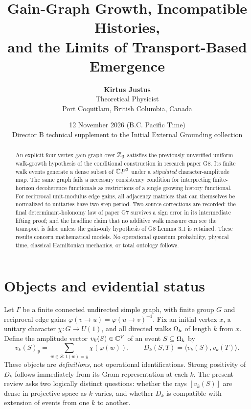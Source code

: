 \documentclass[11pt]{article}
\title{\vspace{-1.7em}\color{navy}\bfseries Gain-Graph Growth, Incompatible Histories,\\ and the Limits of Transport-Based Emergence}
\author{\textbf{Kirtus Justus}\\Theoretical Physicist\\Port Coquitlam, British Columbia, Canada}
\date{12 November 2026 (B.C. Pacific Time)\\\small Director B technical supplement to the Initial External Grounding collection}
\begin{document}
\maketitle\thispagestyle{fancy}
\begin{abstract}
An explicit four-vertex gain graph over $\mathbb Z_3$ satisfies the previously unverified uniform walk-growth hypothesis of the conditional construction in research paper G8. Its finite walk events generate a dense subset of $\mathbb C P^3$ under a \emph{stipulated} character-amplitude map. The same graph fails a necessary consistency condition for interpreting finite-horizon decoherence functionals as restrictions of a single growing history functional. For reciprocal unit-modulus edge gains, all adjacency matrices that can themselves be normalized to unitaries have two-step period. Two source corrections are recorded: the final determinant-holonomy law of paper G7 survives a sign error in its intermediate lifting proof; and the headline claim that no additive walk measure can see the transport is false unless the gain-only hypothesis of G8 Lemma 3.1 is retained. These results concern mathematical models. No operational quantum probability, physical time, classical Hamiltonian mechanics, or total ontology follows.
\end{abstract}

\section{Objects and evidential status}
Let $\Gamma$ be a finite connected undirected simple graph, with finite group $G$ and reciprocal edge gains $\varphi(v\to u)=\varphi(u\to v)^{-1}$. Fix an initial vertex $x$, a unitary character $\chi:G\to U(1)$, and all directed walks $\Omega_k$ of length $k$ from $x$. Define the amplitude vector $v_k(S)\in\mathbb C^V$ of an event $S\subseteq\Omega_k$ by
\begin{equation}\label{eq:v}
 v_k(S)_y=\sum_{w\in S:\,t(w)=y}\chi(\varphi(w)),\qquad D_k(S,T)=\langle v_k(S),v_k(T)\rangle.
\end{equation}
These objects are \emph{definitions}, not operational identifications. Strong positivity of $D_k$ follows immediately from its Gram representation at each $k$. The present review asks two logically distinct questions: whether the rays $[v_k(S)]$ are dense in projective space as $k$ varies, and whether $D_k$ is compatible with extension of events from one $k$ to another.
\end{document}
